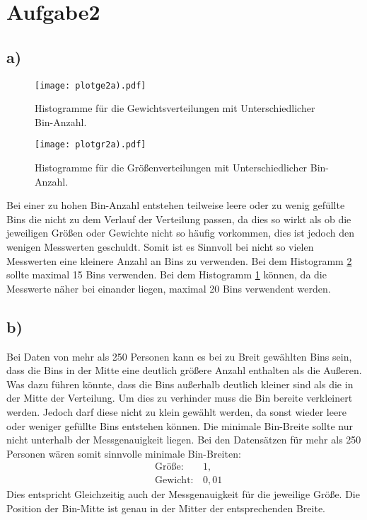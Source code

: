 \newpage
\section{Aufgabe2}
\label{sec:a2}

\subsection{a)}
\label{subsec:a2a}

\begin{figure}
  \centering
  \texttt{[image: plotge2a).pdf]}
  \caption{Histogramme für die Gewichtsverteilungen mit Unterschiedlicher Bin-Anzahl.}
  \label{fig:gr}
\end{figure}
\FloatBarrier


\begin{figure}
  \centering
  \texttt{[image: plotgr2a).pdf]}
  \caption{Histogramme für die Größenverteilungen mit Unterschiedlicher Bin-Anzahl.}
  \label{fig:ge}
\end{figure}
\FloatBarrier
Bei einer zu hohen Bin-Anzahl entstehen teilweise leere oder zu wenig gefüllte
Bins die nicht zu dem Verlauf der Verteilung passen,
da dies so wirkt als ob die jeweiligen
Größen oder Gewichte nicht so häufig vorkommen, dies ist jedoch den wenigen
Messwerten geschuldt. Somit ist es Sinnvoll bei nicht so vielen Messwerten
eine kleinere Anzahl an Bins zu verwenden. Bei dem Histogramm \ref{fig:ge}
sollte maximal 15 Bins verwenden. Bei dem Histogramm
\ref{fig:gr} können, da die Messwerte näher bei einander liegen,
maximal 20 Bins verwendent werden.



\subsection{b)}
\label{subsec:a2b}
Bei Daten von mehr als 250 Personen kann es bei zu Breit gewählten Bins sein,
dass die Bins in der Mitte eine deutlich größere Anzahl enthalten als die Außeren.
Was dazu führen könnte, dass
die Bins außerhalb deutlich kleiner sind als die in der Mitte der Verteilung.
Um dies zu verhinder muss die Bin bereite verkleinert werden. Jedoch darf
diese nicht zu klein gewählt werden, da sonst wieder leere oder weniger gefüllte Bins entstehen
können.
Die minimale Bin-Breite sollte nur nicht unterhalb der Messgenauigkeit liegen.
Bei den Datensätzen für mehr als 250
Personen wären somit sinnvolle minimale Bin-Breiten:
\begin{align*}
  &\text{Größe:} \, &1, \\
  &\text{Gewicht:}\, &0,01
\end{align*}
Dies entspricht Gleichzeitig auch der Messgenauigkeit für die jeweilige Größe.
Die Position der Bin-Mitte ist genau in der Mitter der entsprechenden Breite.
\newpage
